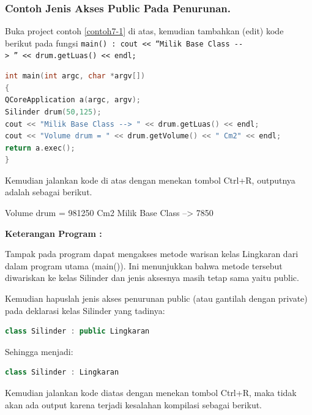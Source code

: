 \subsubsection*{Contoh  Jenis Akses Public Pada Penurunan.}

Buka project contoh \ref{contoh7-1} di atas, kemudian tambahkan (edit) kode berikut
pada fungsi
\texttt{main()\ :\ cout\ \textless{}\textless{}\ ``Milik\ Base\ Class\ -\/-\textgreater{}\ ''\ \textless{}\textless{}\ drum.getLuas()\ \textless{}\textless{}\ endl;}

\begin{lstlisting}[language=c++, caption=Jenis Akses Public Pada Penurunan, label=contoh7-2]
int main(int argc, char *argv[])
{
QCoreApplication a(argc, argv);
Silinder drum(50,125);
cout << "Milik Base Class --> " << drum.getLuas() << endl;
cout << "Volume drum = " << drum.getVolume() << " Cm2" << endl;
return a.exec();
}
\end{lstlisting}

Kemudian jalankan kode di atas dengan menekan tombol Ctrl+R, outputnya
adalah sebagai berikut.
\begin{lcverbatim}
Volume drum = 981250 Cm2
Milik Base Class --> 7850
\end{lcverbatim}


\textbf{Keterangan Program :}

Tampak pada program dapat mengakses metode warisan kelas Lingkaran dari
dalam program utama (main()). Ini menunjukkan bahwa metode tersebut
diwariskan ke kelas Silinder dan jenis aksesnya masih tetap sama yaitu
public.

Kemudian hapuslah jenis akses penurunan public (atau gantilah dengan
private) pada deklarasi kelas Silinder yang tadinya:

\begin{lstlisting}[language=c++, numbers=none]
class Silinder : public Lingkaran
\end{lstlisting}

Sehingga menjadi:

\begin{lstlisting}[language=c++, numbers=none]
class Silinder : Lingkaran
\end{lstlisting}

Kemudian jalankan kode diatas dengan menekan tombol Ctrl+R, maka tidak
akan ada output karena terjadi kesalahan kompilasi sebagai berikut.

\begin{figure}[htbp]
\centering
{}

\end{figure}

